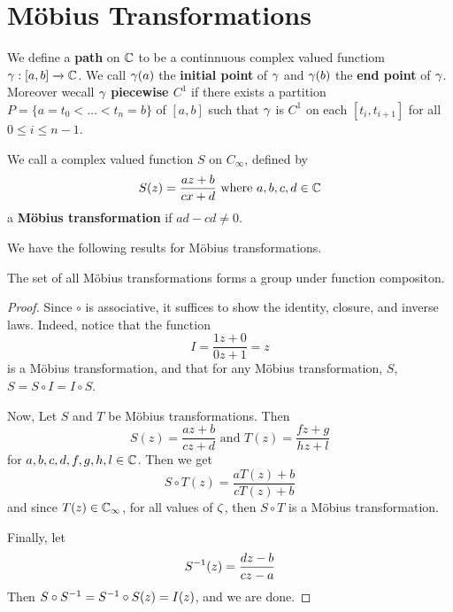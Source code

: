 \section{M\"obius Transformations}

\begin{definition}
    We define a \textbf{path} on $\mathbb{C}$ to be a continnuous complex valued
    functiom $\gamma:[a,b] \xrightarrow{} \mathbb{C}$. We call $\gamma(a)$ the \textbf{initial
    point} of $\gamma$ and $\gamma(b)$ the \textbf{end point} of $\gamma$. Moreover wecall
    $\gamma$ \textbf{piecewise $C^1$} if there exists a partition
    $P=\{a=t_0<\dots<t_n=b\}$ of $[a,b]$ such that $\gamma$ is  $C^1$ on each
    $[t_i,t_{i+1}]$ for all $0 \leq i \leq n-1$.
\end{definition}

\begin{definition}
    We call a complex valued function $S$ on $C_\infty$, defined by
    \begin{equation*}
        S(z)=\frac{az+b}{cx+d} \text{ where } a,b,c,d \in \mathbb{C}
    \end{equation*}
    a \textbf{M\"obius transformation} if $ad-cd \neq 0$.
\end{definition}

We have the following results for M\"obius transformations.

\begin{theorem}\label{3.3.1}
    The set of all M\"obius transformations forms a group under function
    compositon.
\end{theorem}
\begin{proof}
    Since $\circ$ is associative, it suffices to show the identity, closure, and
    inverse laws. Indeed, notice that the function
    \begin{equation*}
        I=\frac{1z+0}{0z+1}=z
    \end{equation*}
    is a M\"obius transformation, and that for any M\"obius transformation, $S$,
    $S=S \circ I=I \circ S$.

    Now, Let $S$ and $T$ be M\"obius transformations. Then
    \begin{equation*}
        S(z)=\frac{az+b}{cz+d} \text{ and } T(z)=\frac{fz+g}{hz+l}
    \end{equation*}
    for $a,b,c,d,f,g,h,l \in \mathbb{C}$. Then we get
    \begin{equation*}
        S \circ T(z)=\frac{aT(z)+b}{cT(z)+b}
    \end{equation*}
    and since $T(z) \in \mathbb{C}_\infty$, for all values of $\zeta$, then $S \circ T$ is a
    M\"obius transformation.

    Finally, let
    \begin{equation*}
        S^{-1}(z)=\frac{dz-b}{cz-a}
    \end{equation*}
    Then $S \circ S^{-1}=S^{-1} \circ S(z)=I(z)$, and we are done.
\end{proof}

